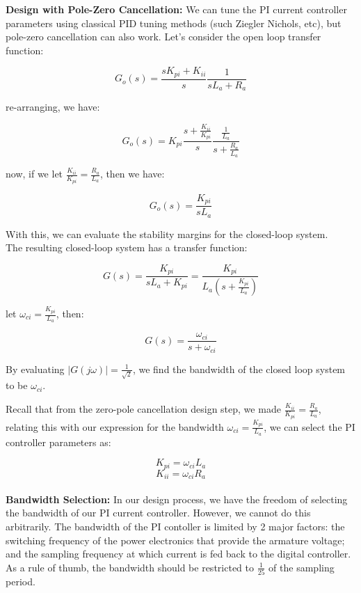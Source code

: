 \documentclass[a4paper]{article}
\begin{document}
\textbf{Design with Pole-Zero Cancellation: } We can tune the PI current controller parameters using classical PID tuning methods 
(such Ziegler Nichols, etc), but pole-zero cancellation can also work. 
Let's consider the open loop transfer function:

$$ G_{o}(s)= \frac{ s K_{pi} + K_{ii} }{s} \frac{1}{ s L_{a} + R_{a} } $$

re-arranging, we have: 

$$ G_{o}(s)= K_{pi} \frac{s + \frac{K_{ii}}{K_{pi}}}{s} \frac{\frac{1}{L_{a}}}{s + \frac{R_{a}}{L_{a}}}  $$

now, if we let $\frac{K_{ii}}{K_{pi}} = \frac{R_{a}}{L_{a}}$, then we have:

$$ G_{o}(s)= \frac{K_{pi}}{s L_{a}}  $$

With this, we can evaluate the stability margins for the closed-loop system.  
\\

The resulting closed-loop system has a transfer function: 

$$ G(s)= \frac{K_{pi}}{s L_{a} + K_{pi}}= \frac{K_{pi}}{ L_{a} \left( s + \frac{K_{pi}}{L_{a}} \right) }$$

let $\omega_{ci}= \frac{K_{pi}}{L_{a}}$, then:

$$ G(s)= \frac{\omega_{ci}}{ s + \omega_{ci} } $$

By evaluating $\left| G(j\omega) \right|= \frac{1}{\sqrt{2}}$, we find the bandwidth of the closed loop system to be $\omega_{ci}$. 

Recall that from the zero-pole cancellation design step, we made $\frac{K_{ii}}{K_{pi}} = \frac{R_{a}}{L_{a}}$, 
relating this with our expression for the bandwidth $\omega_{ci}= \frac{K_{pi}}{L_{a}}$, we can select the PI controller parameters as: 

$$ K_{pi}= \omega_{ci} L_{a} $$
$$ K_{ii}= \omega_{ci} R_{a} $$
\\

\textbf{Bandwidth Selection: } In our design process, we have the freedom of selecting the bandwidth of our PI current controller. 
However, we cannot do this arbitrarily. The bandwidth of the PI contoller is limited by 2 major factors: 
the switching frequency of the power electronics that provide the armature voltage; 
and the sampling frequency at which current is fed back to the digital controller. 
As a rule of thumb, the bandwidth should be restricted to $\frac{1}{25}$ of the sampling period. \\
\end{document}
